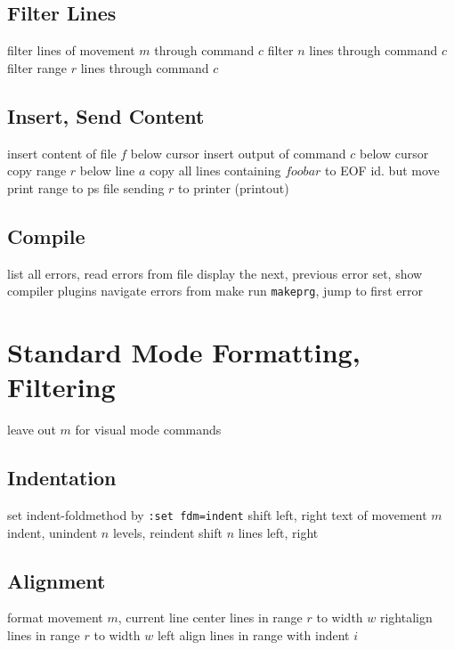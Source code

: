 \subsection{Filter Lines}{}
	{filter lines of movement $m$ through command $c$}
	{filter $n$ lines through command $c$}
	{filter range $r$ lines through command $c$}

\subsection{Insert, Send Content}	{}
	{insert content of file $f$ below cursor}
	{insert output of command $c$ below cursor}
	{copy range $r$ below line $a$}
	{copy all lines containing $foobar$ to EOF}
	{id. but move}
	{print range to ps file}
	{sending $r$ to printer (printout)}

\subsection{Compile}	{}
	{list all errors, read errors from file}
	{display the next, previous error}
	{set, show compiler plugins}
	{navigate errors from make}
	{run {\tt makeprg}, jump to first error}

\section{Standard Mode Formatting, Filtering}	{leave out $m$ for visual mode commands}
\subsection{Indentation}{set indent-foldmethod by {\tt :set fdm=indent}}
	{shift left, right text of movement $m$}
	{indent, unindent $n$ levels, reindent}
	{shift $n$ lines left, right}

\subsection{Alignment}{}
	{format movement $m$, current line}
	{center lines in range $r$ to width $w$}
	{rightalign lines in range $r$ to width $w$}
	{left align lines in range with indent $i$}

